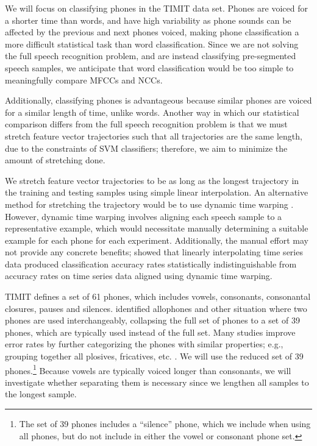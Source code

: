 We will focus on classifying
phones in the TIMIT data set.
Phones are voiced
for a shorter time than words,
and have high variability
as phone sounds can be affected
by the previous and next phones voiced,
making phone classification
a more difficult statistical task
than word classification.
Since we are not solving the full
speech recognition problem,
and are instead classifying
pre-segmented speech samples,
we anticipate that word classification
would be too simple to meaningfully
compare MFCCs and NCCs.

Additionally, classifying phones
is advantageous because similar phones
are voiced for a similar length of time,
unlike words.
Another way in which our statistical comparison
differs from the full speech recognition problem
is that we must stretch
feature vector trajectories
such that all trajectories are the same length,
due to the constraints of SVM classifiers;
therefore,
we aim to minimize the amount
of stretching done.

We stretch feature vector trajectories
to be as long as the longest trajectory
in the training and testing samples
using simple linear interpolation.
An alternative method
for stretching the trajectory
would be to use dynamic time warping
\citep{ratanamahatana2004}.
However, dynamic time warping
involves aligning each speech sample
to a representative example,
which would necessitate manually
determining a suitable example
for each phone for each experiment.
Additionally, the manual effort may not
provide any concrete benefits;
\citeauthor{ratanamahatana2004}
showed that linearly interpolating
time series data
produced classification accuracy rates
statistically indistinguishable
from accuracy rates on time series data
aligned using dynamic time warping.

TIMIT defines a set of 61 phones,
which includes vowels, consonants,
consonantal closures, pauses and silences.
\citet{lee1989} identified allophones and
other situation where two phones
are used interchangeably,
collapsing the full set of phones
to a set of 39 phones,
which are typically used
instead of the full set.
Many studies improve error rates
by further categorizing
the phones with similar properties;
e.g., grouping together all
plosives, fricatives, etc.
\citep{lopes2011}.
We will use the reduced set of 39 phones.\footnote{
  The set of 39 phones includes a ``silence'' phone,
  which we include when using all phones,
  but do not include in either
  the vowel or consonant phone set.}
Because vowels are typically voiced
longer than consonants,
we will investigate whether
separating them is necessary
since we lengthen all samples
to the longest sample.


